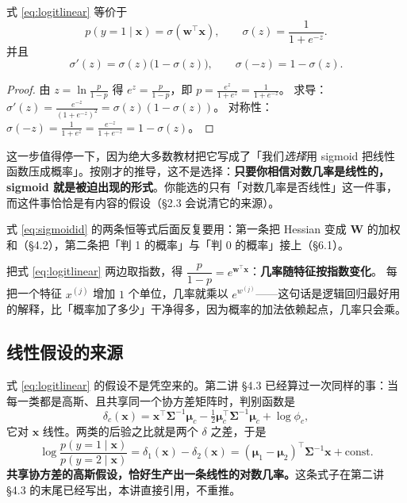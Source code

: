 \documentclass[11pt,a4paper,fontset=windows,zihao=-4]{ctexart}
\newcommand{\bw}{\mathbf{w}}
\newcommand{\bx}{\mathbf{x}}
\newcommand{\bW}{\mathbf{W}}
\newcommand{\bSigma}{\boldsymbol{\Sigma}}
\newcommand{\bmu}{\boldsymbol{\mu}}
\newcommand{\tp}{^{\top}}
\begin{document}
\begin{prop}
式 \eqref{eq:logitlinear} 等价于
\begin{equation}
  p(y=1\mid\bx)=\sigma(\bw\tp\bx),\qquad
  \sigma(z)=\frac{1}{1+e^{-z}} .
  \label{eq:sigmoid}
\end{equation}
并且
\begin{equation}
  \sigma'(z)=\sigma(z)\bigl(1-\sigma(z)\bigr),\qquad
  \sigma(-z)=1-\sigma(z).
  \label{eq:sigmoidid}
\end{equation}
\end{prop}

\begin{proof}
由 $z=\ln\frac{p}{1-p}$ 得 $e^{z}=\frac{p}{1-p}$，即 $p=\frac{e^{z}}{1+e^{z}}=\frac{1}{1+e^{-z}}$。
求导：$\sigma'(z)=\frac{e^{-z}}{(1+e^{-z})^{2}}=\sigma(z)(1-\sigma(z))$。
对称性：$\sigma(-z)=\frac{1}{1+e^{z}}=\frac{e^{-z}}{1+e^{-z}}=1-\sigma(z)$。
\end{proof}

这一步值得停一下，因为绝大多数教材把它写成了「我们\emph{选择}用 sigmoid 把线性函数压成概率」。按刚才的推导，这不是选择：\textbf{只要你相信对数几率是线性的，sigmoid 就是被迫出现的形式}。你能选的只有「对数几率是否线性」这一件事，而这件事恰恰是有内容的假设（\S2.3 会说清它的来源）。

式 \eqref{eq:sigmoidid} 的两条恒等式后面反复要用：第一条把 Hessian 变成 $\bW$ 的加权和（\S4.2），第二条把「判 1 的概率」与「判 0 的概率」接上（\S6.1）。

\begin{add}
把式 \eqref{eq:logitlinear} 两边取指数，得 $\dfrac{p}{1-p}=e^{\bw\tp\bx}$：\textbf{几率随特征按指数变化}。
每把一个特征 $x^{(j)}$ 增加 $1$ 个单位，几率就乘以 $e^{w^{(j)}}$——这句话是逻辑回归最好用的解释，比「概率加了多少」干净得多，因为概率的加法依赖起点，几率只会乘。
\end{add}
\subsection{线性假设的来源}

式 \eqref{eq:logitlinear} 的假设不是凭空来的。第二讲 \S4.3 已经算过一次同样的事：当每一类都是高斯、且共享同一个协方差矩阵时，判别函数是
\begin{equation}
  \delta_c(\bx)=\bx\tp\bSigma^{-1}\bmu_c-\tfrac12\bmu_c\tp\bSigma^{-1}\bmu_c+\log\phi_c ,
  \label{eq:deltac}
\end{equation}
它对 $\bx$ 线性。两类的后验之比就是两个 $\delta$ 之差，于是
\begin{equation}
  \log\frac{p(y=1\mid\bx)}{p(y=2\mid\bx)}
  =\delta_1(\bx)-\delta_2(\bx)
  =(\bmu_1-\bmu_2)\tp\bSigma^{-1}\bx+\text{const}.
  \label{eq:gdaLogit}
\end{equation}
\textbf{共享协方差的高斯假设，恰好生产出一条线性的对数几率。}这条式子在第二讲 \S4.3 的末尾已经写出，本讲直接引用，不重推。
\end{document}
